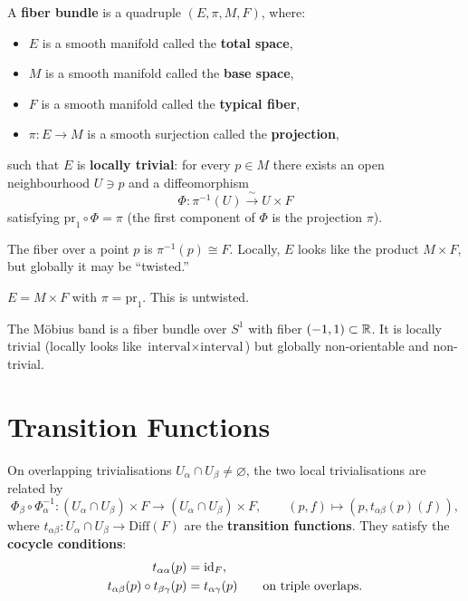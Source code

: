 \begin{definition}
A \textbf{fiber bundle} is a quadruple $(E, \pi, M, F)$, where:
\begin{itemize}
\item $E$ is a smooth manifold called the \textbf{total space},
\item $M$ is a smooth manifold called the \textbf{base space},
\item $F$ is a smooth manifold called the \textbf{typical fiber},
\item $\pi: E \to M$ is a smooth surjection called the \textbf{projection},
\end{itemize}
such that $E$ is \textbf{locally trivial}: for every $p \in M$ there exists an open neighbourhood $U \ni p$ and a diffeomorphism
\begin{equation}
\Phi: \pi^{-1}(U) \xrightarrow{\;\sim\;} U \times F
\end{equation}
satisfying $\mathrm{pr}_1 \circ \Phi = \pi$ (the first component of $\Phi$ is the projection $\pi$).
\end{definition}

The fiber over a point $p$ is $\pi^{-1}(p) \cong F$. Locally, $E$ looks like the product $M \times F$, but globally it may be ``twisted.''

\begin{example}
$E = M \times F$ with $\pi = \mathrm{pr}_1$. This is untwisted.
\end{example}

\begin{example}
The M\"obius band is a fiber bundle over $S^1$ with fiber $(-1, 1) \subset \mathbb{R}$. It is locally trivial (locally looks like $\text{interval} \times \text{interval}$) but globally non-orientable and non-trivial.
\end{example}

\section{Transition Functions}

On overlapping trivialisations $U_\alpha \cap U_\beta \neq \varnothing$, the two local trivialisations are related by
\begin{equation}
\Phi_\beta \circ \Phi_\alpha^{-1}: (U_\alpha \cap U_\beta) \times F \to (U_\alpha \cap U_\beta) \times F, \qquad (p, f) \mapsto (p, t_{\alpha\beta}(p)(f)),
\end{equation}
where $t_{\alpha\beta}: U_\alpha \cap U_\beta \to \mathrm{Diff}(F)$ are the \textbf{transition functions}. They satisfy the \textbf{cocycle conditions}:
\begin{align}
t_{\alpha\alpha}(p) &= \mathrm{id}_F, \\
t_{\alpha\beta}(p) \circ t_{\beta\gamma}(p) &= t_{\alpha\gamma}(p) \qquad \text{on triple overlaps}.
\end{align}

